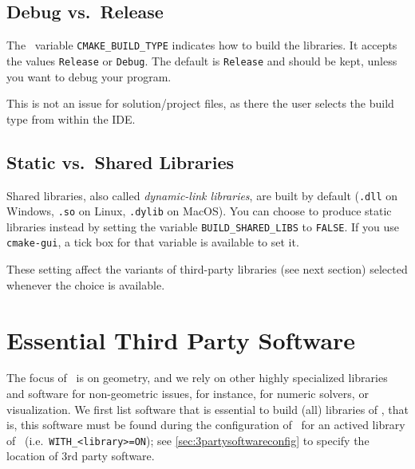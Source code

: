 \addtocounter{footnote}{1}




\subsection{Debug vs.\ Release}

The \cmake\ variable \texttt{CMAKE\_BUILD\_TYPE} indicates how to build
the libraries. It accepts the values \texttt{Release} or
\texttt{Debug}. The default is \texttt{Release} and should be kept, unless you want to debug
your program.

This is not an issue for solution/project files, as there the user selects the build type from within the IDE.

\subsection{Static vs.\ Shared Libraries }

Shared libraries, also called \emph{dynamic-link libraries}, are built by default
(\texttt{.dll} on Windows, \texttt{.so} on Linux, \texttt{.dylib} on MacOS).  You
can choose to produce static libraries instead by setting the \cmake{}
variable \texttt{BUILD\_SHARED\_LIBS} to \texttt{FALSE}.  If you use
\texttt{cmake-gui}, a tick box for that variable is available to set it.

These setting affect the variants of third-party libraries (see next
section) selected whenever the choice is available.

\section{Essential Third Party Software\label{sec:essential3rdpartysoftware}}

The focus of \cgal\ is on geometry, and we rely on other
highly specialized libraries and software for non-geometric issues,
for instance, for numeric solvers, or visualization. We first list software
that is essential to build (all) libraries of \cgal, that is, 
this software must be found during the configuration of \cgal\ for an
actived library of \cgal\ (i.e.~\texttt{WITH\_<library>=ON});
see \ref{sec:3partysoftwareconfig} to specify the location of 3rd
party software.

